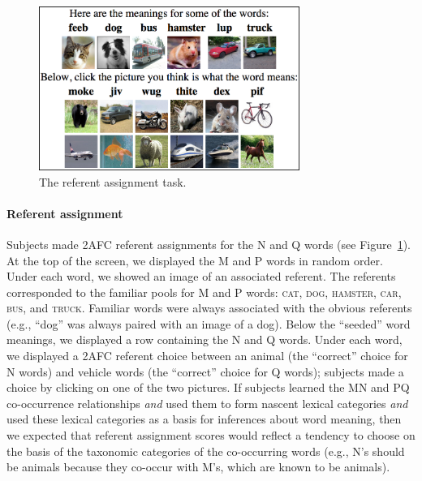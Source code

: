 \documentclass[man,floatsintext]{apa6}
\begin{document}
\begin{figure}[ht]
\begin{center}
  \caption{The referent assignment task.}
  \label{meaning-task}
  \includegraphics[width=8.5cm]{meaning-html-cropped.png}
\end{center}
\end{figure}

\paragraph{Referent assignment}
Subjects made 2AFC referent assignments for the N and Q words (see Figure~\ref{meaning-task}). At the top of the screen, we displayed the M and P words in random order. Under each word, we showed an image of an associated referent. The referents corresponded to the familiar pools for M and P words: \textsc{cat}, \textsc{dog}, \textsc{hamster}, \textsc{car}, \textsc{bus}, and \textsc{truck}. Familiar words were always associated with the obvious referents (e.g., ``dog'' was always paired with an image of a dog). Below the ``seeded'' word meanings, we displayed a row containing the N and Q words. Under each word, we displayed a 2AFC referent choice between an animal (the ``correct'' choice for N words) and vehicle words (the ``correct'' choice for Q words); subjects made a choice by clicking on one of the two pictures. If subjects learned the MN and PQ co-occurrence relationships \emph{and} used them to form nascent lexical categories \emph{and} used these lexical categories as a basis for inferences about word meaning, then we expected that referent assignment scores would reflect a tendency to choose on the basis of the taxonomic categories of the co-occurring words (e.g., N's should be animals because they co-occur with M's, which are known to be animals).
\end{document}

